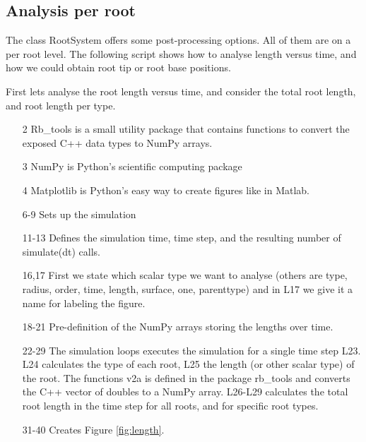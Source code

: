 \documentclass[a4paper]{article}
\begin{document}
\subsection{Analysis per root}

The class RootSystem offers some post-processing options. All of them are on a per root level. 
The following script shows how to analyse length versus time, and how we could obtain root tip or root base positions. 

First lets analyse the root length versus time, and consider the total root length, and root length per type. 



\begin{itemize}

\item[2] Rb\_tools is a small utility package that contains functions to convert the exposed C++ data types to NumPy arrays. 
\item[3] NumPy is Python's scientific computing package
\item[4] Matplotlib is Python's easy way to create figures like in Matlab.

\item[6-9] Sets up the simulation

\item[11-13] Defines the simulation time, time step, and the resulting number of simulate(dt) calls. 

\item[16,17] First we state which scalar type we want to analyse (others are type, radius, order, time, length, surface, one, parenttype) and in L17 we give it a name for labeling the figure. 

\item[18-21] Pre-definition of the NumPy arrays storing the lengths over time. 

\item[22-29] The simulation loops executes the simulation for a single time step L23. L24 calculates the type of each root, L25 the length (or other scalar type) of the root. 
The functions v2a is defined in the package rb\_tools and converts the C++ vector of doubles to a NumPy array. L26-L29 calculates the total root length in the time step for all roots, and for specific root types.

\item[31-40] Creates Figure \ref{fig:length}.

\end{itemize}
\end{document}
